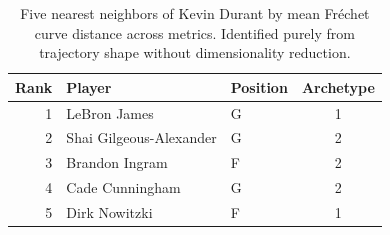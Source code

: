 \begin{table}[htbp]
  \centering\small
  \begin{tabular}{rllc}
    \toprule
    Rank & Player & Position & Archetype \\
    \midrule
    1 & LeBron James & G & 1 \\
    2 & Shai Gilgeous-Alexander & G & 2 \\
    3 & Brandon Ingram & F & 2 \\
    4 & Cade Cunningham & G & 2 \\
    5 & Dirk Nowitzki & F & 1 \\
    \bottomrule
  \end{tabular}
  \caption{Five nearest neighbors of Kevin Durant by mean Fr\'{e}chet curve distance across metrics. Identified purely from trajectory shape without dimensionality reduction.}
  \label{tab:Kevin_Durant_frechet_curve_neighbors}
\end{table}

